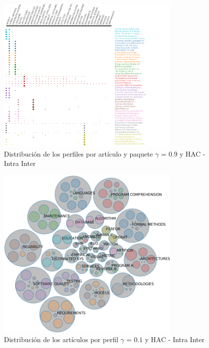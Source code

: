 \begin{figure}[H]
  \centering
    \includegraphics[width=0.8\textwidth]{resultados/papers/HAC/INTRA_INTER/gamma-09.png}
  \caption{Distribución de los perfiles por artículo y paquete $\gamma$ = $0.9$ y HAC - Intra Inter}
  \label{res:img-papers-gamma09-hac-intra-inter}
\end{figure}

\begin{figure}[H]
  \centering
    \includegraphics[width=0.8\textwidth]{resultados/papers/HAC/INTRA_INTER/bubbles-gamma-01.png}
  \caption{Distribución de los artículos por perfil $\gamma$ = $0.1$ y HAC - Intra Inter}
  \label{res:img-papers-bubbles-gamma01-hac-intra-inter}
\end{figure}

